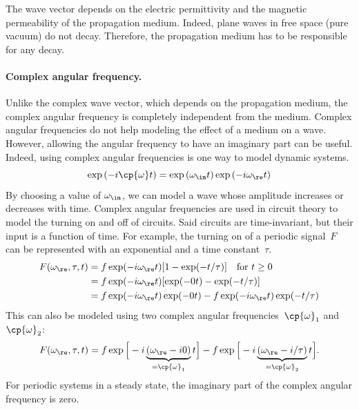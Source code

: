 The wave vector depends on the electric permittivity and the magnetic permeability of the propagation medium.
Indeed, plane waves in free space (pure vacuum) do not decay.
Therefore, the propagation medium has to be responsible for any decay.


\paragraph{Complex angular frequency.}
\label{sec:complex_angular_frequency}

Unlike the complex wave vector, which depends on the propagation medium, the complex angular frequency is completely independent from the medium.
Complex angular frequencies do not help modeling the effect of a medium on a wave.
However, allowing the angular frequency to have an imaginary part can be useful.
Indeed, using complex angular frequencies is one way to model dynamic systems.
\begin{equation}
    \exp \left( -i \cp{\omega} t \right)
    =
    \exp \left(    \omega_\im t \right)
    \exp \left( -i \omega_\re t \right)
\end{equation}
By choosing a value of $\omega_\im$, we can model a wave whose amplitude increases or decreases with time.
Complex angular frequencies are used in circuit theory to model the turning on and off of circuits.
Said circuits are time-invariant, but their input is a function of time.
For example, the turning on of a periodic signal~$F$ can be represented with an exponential and a time constant~$\tau$.
\begin{subequations}
    \begin{align}
        F(\omega_\re, \tau, t)
        &= f \exp(-i \omega_\re t) [1 - \exp(-t/\tau)] \quad \text{for }t \geq 0
        \\
        &= f \exp(-i \omega_\re t) [\exp(-0 t) - \exp(-t/\tau)]
        \\
        &= f \exp(-i \omega_\re t) \exp(-0 t) - f \exp(-i \omega_\re t) \exp(-t/\tau)
    \end{align}
\end{subequations}
This can also be modeled using two complex angular frequencies~$\cp{\omega}_1$ and~$\cp{\omega}_2$:
\begin{equation}
    F(\omega_\re, \tau, t)
    =
    f \exp
    \Big[
        - i
        \underbrace{
            (\omega_\re - i 0)
        }_{=\cp{\omega}_1}
        t
    \Big]
    -
    f \exp
    \Big[
        - i
        \underbrace{
            (\omega_\re - i / \tau)
        }_{=\cp{\omega}_2}
        t
    \Big]
    \text{.}
\end{equation}
For periodic systems in a steady state, the imaginary part of the complex angular frequency is zero.



